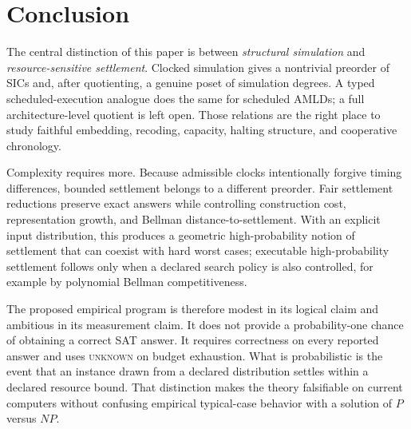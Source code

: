 \documentclass[11pt]{article}
\theoremstyle{definition}
\begin{document}
\section{Conclusion}
The central distinction of this paper is between \emph{structural simulation} and \emph{resource-sensitive settlement}. Clocked simulation gives a nontrivial preorder of SICs and, after quotienting, a genuine poset of simulation degrees. A typed scheduled-execution analogue does the same for scheduled AMLDs; a full architecture-level quotient is left open. Those relations are the right place to study faithful embedding, recoding, capacity, halting structure, and cooperative chronology.

Complexity requires more. Because admissible clocks intentionally forgive timing differences, bounded settlement belongs to a different preorder. Fair settlement reductions preserve exact answers while controlling construction cost, representation growth, and Bellman distance-to-settlement. With an explicit input distribution, this produces a geometric high-probability notion of settlement that can coexist with hard worst cases; executable high-probability settlement follows only when a declared search policy is also controlled, for example by polynomial Bellman competitiveness.

The proposed empirical program is therefore modest in its logical claim and ambitious in its measurement claim. It does not provide a probability-one chance of obtaining a correct SAT answer. It requires correctness on every reported answer and uses \textsc{unknown} on budget exhaustion. What is probabilistic is the event that an instance drawn from a declared distribution settles within a declared resource bound. That distinction makes the theory falsifiable on current computers without confusing empirical typical-case behavior with a solution of $P$ versus $NP$.
\end{document}

